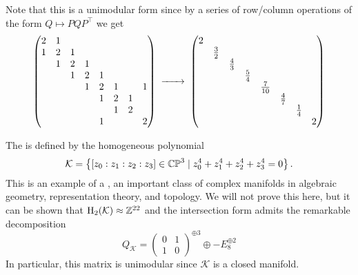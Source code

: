 Note that this is a unimodular form since by a series of row/column operations of the form $Q\mapsto PQP^\intercal$ we get
	\[
		\begin{pmatrix}
			2 & 1 &   &   &   &   &   &   \\
			1 & 2 & 1 &   &   &   &   &   \\
			  & 1 & 2 & 1 &   &   &   &   \\
			  &   & 1 & 2 & 1 &   &   &   \\
			  &   &   & 1 & 2 & 1 &   & 1 \\
			  &   &   &   & 1 & 2 & 1 &   \\
			  &   &   &   &   & 1 & 2 &   \\
			  &   &   &   & 1 &   &   & 2 \\
		\end{pmatrix}
		\lkxto
		\begin{pmatrix}
			2 &             &             &             &              &             &             &   \\
			  & \frac{3}{2} &             &             &              &             &             &   \\
			  &             & \frac{4}{3} &             &              &             &             &   \\
			  &             &             & \frac{5}{4} &              &             &             &   \\
			  &             &             &             & \frac{7}{10} &             &             &   \\
			  &             &             &             &              & \frac{4}{7} &             &   \\
			  &             &             &             &              &             & \frac{1}{4} &   \\
			  &             &             &             &              &             &             & 2 \\
		\end{pmatrix}
	\]

\begin{example}\label{example:k3}
	The  is defined by the homogeneous polynomial
	\[
		\mathcal{K} = \left\{ [z_0 : z_1 : z_2 : z_3]\in \mathbb{CP}^3 \mid z_0^4 + z_1^4+z_2^4 + z_3^4=0\right\}.
	\]
	This is an example of a , an important class of complex manifolds in algebraic geometry, representation theory, and topology.
	We will not prove this here, but it can be shown that $\operatorname{H}_2(\mathcal{K})\approx \mathbb{Z}^{22}$ and the intersection form admits the remarkable decomposition
	\[
		Q_{\mathcal{K}} =
		\begin{pmatrix}
			0 & 1 \\ 1 & 0
		\end{pmatrix}^{\oplus 3}\oplus
		-E_8^{\oplus 2}
	\]
	In particular, this matrix is unimodular since $\mathcal{K}$ is a closed manifold. 
\end{example}

